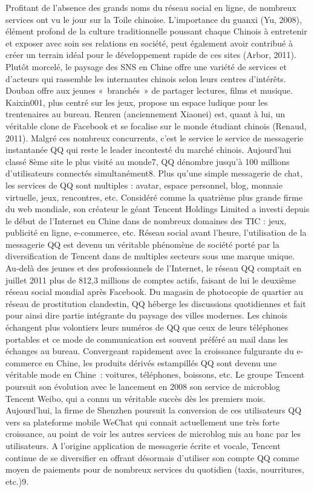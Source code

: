 Profitant de l’absence des grands noms du réseau social en ligne, de nombreux services ont vu le jour sur la Toile chinoise. L'importance du guanxi (Yu, 2008), élément profond de la culture traditionnelle poussant chaque Chinois à entretenir et exposer avec soin ses relations en société, peut également avoir contribué à créer un terrain idéal pour le développement rapide de ces sites (Arbor, 2011). Plutôt morcelé, le paysage des SNS en Chine offre une variété de services et d’acteurs qui rassemble les internautes chinois selon leurs centres d'intérêts. Douban offre aux jeunes « branchés » de partager lectures, films et musique. Kaixin001, plus centré sur les jeux, propose un espace ludique pour les trentenaires au bureau. Renren (anciennement Xiaonei) est, quant à lui, un véritable clone de Facebook et se focalise sur le monde étudiant chinois (Renaud, 2011). Malgré ces nombreux concurrents, c’est le service le service de messagerie instantanée QQ qui reste le leader incontesté du marché chinois. Aujourd’hui classé 8ème site le plus visité au monde7, QQ dénombre jusqu’à 100 millions d’utilisateurs connectés simultanément8. Plus qu’une simple messagerie de chat, les services de QQ sont multiples : avatar, espace personnel, blog, monnaie virtuelle, jeux, rencontres, etc. Considéré comme la quatrième plus grande firme du web mondiale, son créateur le géant Tencent Holdings Limited a investi depuis le début de l’Internet en Chine dans de nombreux domaines des TIC : jeux, publicité en ligne, e-commerce, etc. Réseau social avant l’heure, l’utilisation de la messagerie QQ est devenu un véritable phénomène de société porté par la diversification de Tencent dans de multiples secteurs sous une marque unique. Au-delà des jeunes et des professionnels de l’Internet, le réseau QQ comptait en juillet 2011 plus de 812,3 millions de comptes actifs, faisant de lui le deuxième réseau social mondial après Facebook. Du magasin de photocopie de quartier au réseau de prostitution clandestin, QQ héberge les discussions quotidiennes et fait pour ainsi dire partie intégrante du paysage des villes modernes. Les chinois échangent plus volontiers leurs numéros de QQ que ceux de leurs téléphones portables et ce mode de communication est souvent préféré au mail dans les échanges au bureau. Convergeant rapidement avec la croissance fulgurante du e-commerce en Chine, les produits dérivés estampillés QQ sont devenu une véritable mode en Chine : voitures, téléphones, boissons, etc. Le groupe Tencent poursuit son évolution avec le lancement en 2008 son service de microblog Tencent Weibo, qui a connu un véritable succès dès les premiers mois. Aujourd’hui, la firme de Shenzhen poursuit la conversion de ces utilisateurs QQ vers sa plateforme mobile WeChat qui connait actuellement une très forte croissance, au point de voir les autres services de microblog mis au banc par les utilisateurs. A l’origine application de messagerie écrite et vocale, Tencent continue de se diversifier en offrant désormais d’utiliser son compte QQ comme moyen de paiements pour de nombreux services du quotidien (taxis, nourritures, etc.)9.

